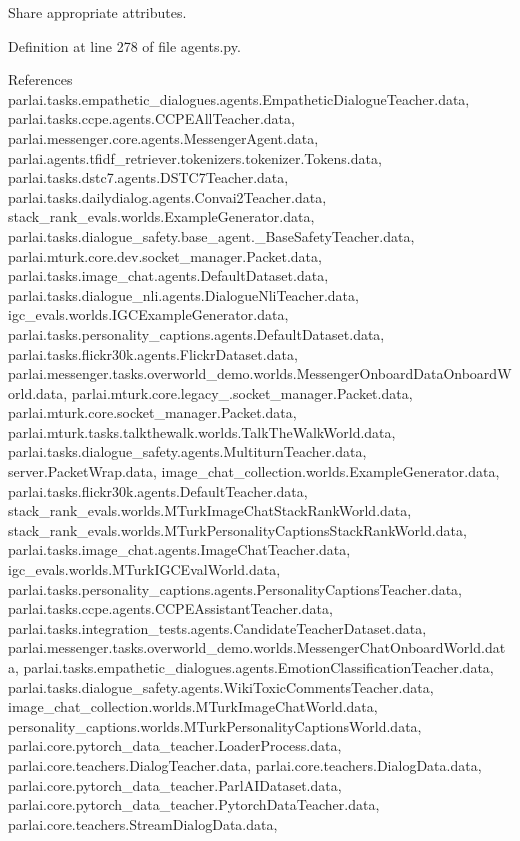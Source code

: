 \begin{DoxyVerb}Share appropriate attributes.\end{DoxyVerb}
 

Definition at line 278 of file agents.\+py.



References parlai.\+tasks.\+empathetic\+\_\+dialogues.\+agents.\+Empathetic\+Dialogue\+Teacher.\+data, parlai.\+tasks.\+ccpe.\+agents.\+C\+C\+P\+E\+All\+Teacher.\+data, parlai.\+messenger.\+core.\+agents.\+Messenger\+Agent.\+data, parlai.\+agents.\+tfidf\+\_\+retriever.\+tokenizers.\+tokenizer.\+Tokens.\+data, parlai.\+tasks.\+dstc7.\+agents.\+D\+S\+T\+C7\+Teacher.\+data, parlai.\+tasks.\+dailydialog.\+agents.\+Convai2\+Teacher.\+data, stack\+\_\+rank\+\_\+evals.\+worlds.\+Example\+Generator.\+data, parlai.\+tasks.\+dialogue\+\_\+safety.\+base\+\_\+agent.\+\_\+\+Base\+Safety\+Teacher.\+data, parlai.\+mturk.\+core.\+dev.\+socket\+\_\+manager.\+Packet.\+data, parlai.\+tasks.\+image\+\_\+chat.\+agents.\+Default\+Dataset.\+data, parlai.\+tasks.\+dialogue\+\_\+nli.\+agents.\+Dialogue\+Nli\+Teacher.\+data, igc\+\_\+evals.\+worlds.\+I\+G\+C\+Example\+Generator.\+data, parlai.\+tasks.\+personality\+\_\+captions.\+agents.\+Default\+Dataset.\+data, parlai.\+tasks.\+flickr30k.\+agents.\+Flickr\+Dataset.\+data, parlai.\+messenger.\+tasks.\+overworld\+\_\+demo.\+worlds.\+Messenger\+Onboard\+Data\+Onboard\+World.\+data, parlai.\+mturk.\+core.\+legacy\+\_.\+socket\+\_\+manager.\+Packet.\+data, parlai.\+mturk.\+core.\+socket\+\_\+manager.\+Packet.\+data, parlai.\+mturk.\+tasks.\+talkthewalk.\+worlds.\+Talk\+The\+Walk\+World.\+data, parlai.\+tasks.\+dialogue\+\_\+safety.\+agents.\+Multiturn\+Teacher.\+data, server.\+Packet\+Wrap.\+data, image\+\_\+chat\+\_\+collection.\+worlds.\+Example\+Generator.\+data, parlai.\+tasks.\+flickr30k.\+agents.\+Default\+Teacher.\+data, stack\+\_\+rank\+\_\+evals.\+worlds.\+M\+Turk\+Image\+Chat\+Stack\+Rank\+World.\+data, stack\+\_\+rank\+\_\+evals.\+worlds.\+M\+Turk\+Personality\+Captions\+Stack\+Rank\+World.\+data, parlai.\+tasks.\+image\+\_\+chat.\+agents.\+Image\+Chat\+Teacher.\+data, igc\+\_\+evals.\+worlds.\+M\+Turk\+I\+G\+C\+Eval\+World.\+data, parlai.\+tasks.\+personality\+\_\+captions.\+agents.\+Personality\+Captions\+Teacher.\+data, parlai.\+tasks.\+ccpe.\+agents.\+C\+C\+P\+E\+Assistant\+Teacher.\+data, parlai.\+tasks.\+integration\+\_\+tests.\+agents.\+Candidate\+Teacher\+Dataset.\+data, parlai.\+messenger.\+tasks.\+overworld\+\_\+demo.\+worlds.\+Messenger\+Chat\+Onboard\+World.\+data, parlai.\+tasks.\+empathetic\+\_\+dialogues.\+agents.\+Emotion\+Classification\+Teacher.\+data, parlai.\+tasks.\+dialogue\+\_\+safety.\+agents.\+Wiki\+Toxic\+Comments\+Teacher.\+data, image\+\_\+chat\+\_\+collection.\+worlds.\+M\+Turk\+Image\+Chat\+World.\+data, personality\+\_\+captions.\+worlds.\+M\+Turk\+Personality\+Captions\+World.\+data, parlai.\+core.\+pytorch\+\_\+data\+\_\+teacher.\+Loader\+Process.\+data, parlai.\+core.\+teachers.\+Dialog\+Teacher.\+data, parlai.\+core.\+teachers.\+Dialog\+Data.\+data, parlai.\+core.\+pytorch\+\_\+data\+\_\+teacher.\+Parl\+A\+I\+Dataset.\+data, parlai.\+core.\+pytorch\+\_\+data\+\_\+teacher.\+Pytorch\+Data\+Teacher.\+data, parlai.\+core.\+teachers.\+Stream\+Dialog\+Data.\+data, 